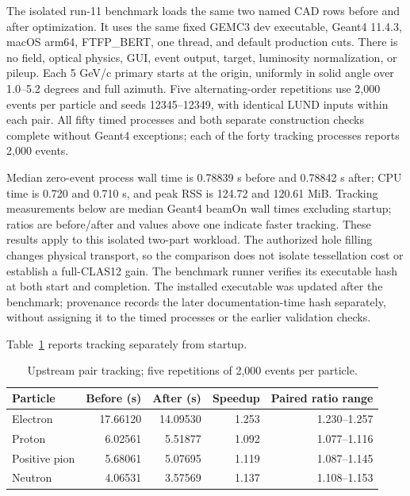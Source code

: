 The isolated run-11 benchmark loads the same two named CAD rows before and after optimization. It uses the
same fixed GEMC3 dev executable, Geant4 11.4.3, macOS arm64, FTFP\_BERT, one thread, and default production
cuts. There is no field, optical physics, GUI, event output, target, luminosity normalization, or pileup. Each
5 GeV/c primary starts at the origin, uniformly in solid angle over 1.0--5.2 degrees and full azimuth. Five
alternating-order repetitions use 2,000 events per particle and seeds 12345--12349, with identical LUND inputs
within each pair. All fifty timed processes and both separate construction checks complete without Geant4
exceptions; each of the forty tracking processes reports 2,000 events.

Median zero-event process wall time is 0.78839 s before and 0.78842 s after; CPU time is 0.720 and 0.710 s,
and peak RSS is 124.72 and 120.61 MiB. Tracking measurements below are median Geant4 beamOn wall times
excluding startup; ratios are before/after and values above one indicate faster tracking. These results apply
to this isolated two-part workload. The authorized hole filling changes physical transport, so the comparison
does not isolate tessellation cost or establish a full-CLAS12 gain. The benchmark runner verifies its
executable hash at both start and completion. The installed executable was updated after the benchmark;
provenance records the later documentation-time hash separately, without assigning it to the timed processes
or the earlier validation checks.

Table~\ref{tab:magnets-upstream} reports tracking separately from startup.
\begin{table}[htbp]
\centering
\setlength{\tabcolsep}{8pt}
\caption{Upstream pair tracking; five repetitions of 2,000 events per particle.}
\label{tab:magnets-upstream}
\begin{tabular}{lrrrr}
\toprule
Particle & Before (s) & After (s) & Speedup & Paired ratio range \\
\midrule
Electron & 17.66120 & 14.09530 & 1.253 & 1.230--1.257 \\
Proton & 6.02561 & 5.51877 & 1.092 & 1.077--1.116 \\
Positive pion & 5.68061 & 5.07695 & 1.119 & 1.087--1.145 \\
Neutron & 4.06531 & 3.57569 & 1.137 & 1.108--1.153 \\
\bottomrule
\end{tabular}
\end{table}

